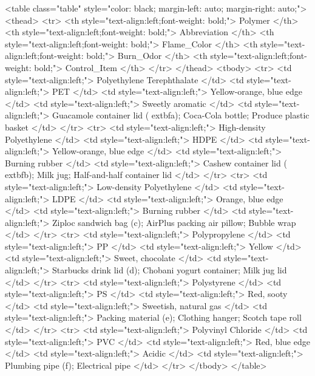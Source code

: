 <table class="table" style="color: black; margin-left: auto; margin-right: auto;">
 <thead>
  <tr>
   <th style="text-align:left;font-weight: bold;"> Polymer </th>
   <th style="text-align:left;font-weight: bold;"> Abbreviation </th>
   <th style="text-align:left;font-weight: bold;"> Flame_Color </th>
   <th style="text-align:left;font-weight: bold;"> Burn_Odor </th>
   <th style="text-align:left;font-weight: bold;"> Control_Item </th>
  </tr>
 </thead>
<tbody>
  <tr>
   <td style="text-align:left;"> Polyethylene Terephthalate </td>
   <td style="text-align:left;"> PET </td>
   <td style="text-align:left;"> Yellow-orange, blue edge </td>
   <td style="text-align:left;"> Sweetly aromatic </td>
   <td style="text-align:left;"> Guacamole container lid (	extbf{a}); Coca-Cola bottle; Produce plastic basket </td>
  </tr>
  <tr>
   <td style="text-align:left;"> High-density Polyethylene </td>
   <td style="text-align:left;"> HDPE </td>
   <td style="text-align:left;"> Yellow-orange, blue edge </td>
   <td style="text-align:left;"> Burning rubber </td>
   <td style="text-align:left;"> Cashew container lid (	extbf{b}); Milk jug; Half-and-half container lid </td>
  </tr>
  <tr>
   <td style="text-align:left;"> Low-density Polyethylene </td>
   <td style="text-align:left;"> LDPE </td>
   <td style="text-align:left;"> Orange, blue edge </td>
   <td style="text-align:left;"> Burning rubber </td>
   <td style="text-align:left;"> Ziploc sandwich bag (c); AirPlus packing air pillow; Bubble wrap </td>
  </tr>
  <tr>
   <td style="text-align:left;"> Polypropylene </td>
   <td style="text-align:left;"> PP </td>
   <td style="text-align:left;"> Yellow </td>
   <td style="text-align:left;"> Sweet, chocolate </td>
   <td style="text-align:left;"> Starbucks drink lid (d); Chobani yogurt container; Milk jug lid </td>
  </tr>
  <tr>
   <td style="text-align:left;"> Polystyrene </td>
   <td style="text-align:left;"> PS </td>
   <td style="text-align:left;"> Red, sooty </td>
   <td style="text-align:left;"> Sweetish, natural gas </td>
   <td style="text-align:left;"> Packing material (e); Clothing hanger; Scotch tape roll </td>
  </tr>
  <tr>
   <td style="text-align:left;"> Polyvinyl Chloride </td>
   <td style="text-align:left;"> PVC </td>
   <td style="text-align:left;"> Red, blue edge </td>
   <td style="text-align:left;"> Acidic </td>
   <td style="text-align:left;"> Plumbing pipe (f); Electrical pipe </td>
  </tr>
</tbody>
</table>
